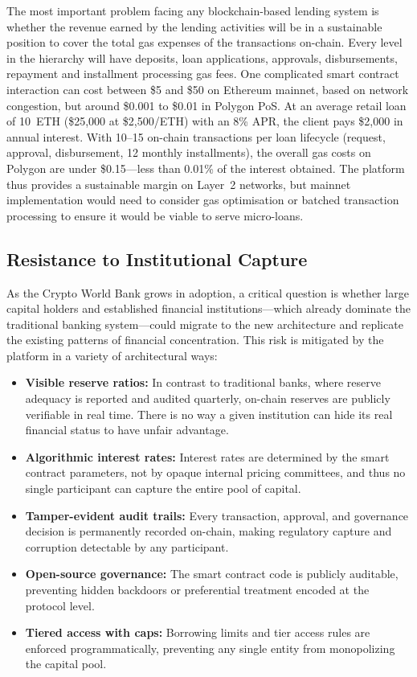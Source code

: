 \documentclass[12pt,a4paper]{report}
\begin{document}
The most important problem facing any blockchain-based lending system is whether the revenue earned by the lending activities will be in a sustainable position to cover the total gas expenses of the transactions on-chain. Every level in the hierarchy will have deposits, loan applications, approvals, disbursements, repayment and installment processing gas fees. One complicated smart contract interaction can cost between \$5 and \$50 on Ethereum mainnet, based on network congestion, but around \$0.001 to \$0.01 in Polygon PoS. At an average retail loan of 10~ETH (\$25,000 at \$2,500/ETH) with an 8\% APR, the client pays \$2,000 in annual interest. With 10--15 on-chain transactions per loan lifecycle (request, approval, disbursement, 12 monthly installments), the overall gas costs on Polygon are under \$0.15---less than 0.01\% of the interest obtained. The platform thus provides a sustainable margin on Layer~2 networks, but mainnet implementation would need to consider gas optimisation or batched transaction processing to ensure it would be viable to serve micro-loans.

\subsection{Resistance to Institutional Capture}

As the Crypto World Bank grows in adoption, a critical question is whether large capital holders and established financial institutions---which already dominate the traditional banking system---could migrate to the new architecture and replicate the existing patterns of financial concentration. This risk is mitigated by the platform in a variety of architectural ways:

\begin{itemize}[noitemsep]
\item \textbf{Visible reserve ratios:} In contrast to traditional banks, where reserve adequacy is reported and audited quarterly, on-chain reserves are publicly verifiable in real time. There is no way a given institution can hide its real financial status to have unfair advantage.
\item \textbf{Algorithmic interest rates:} Interest rates are determined by the smart contract parameters, not by opaque internal pricing committees, and thus no single participant can capture the entire pool of capital.
\item \textbf{Tamper-evident audit trails:} Every transaction, approval, and governance decision is permanently recorded on-chain, making regulatory capture and corruption detectable by any participant.
\item \textbf{Open-source governance:} The smart contract code is publicly auditable, preventing hidden backdoors or preferential treatment encoded at the protocol level.
\item \textbf{Tiered access with caps:} Borrowing limits and tier access rules are enforced programmatically, preventing any single entity from monopolizing the capital pool.
\end{itemize}
\end{document}
